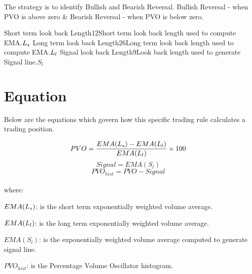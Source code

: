 \documentclass{article}
\begin{document}
\logo
{} %
\tblofcontents


\howtotrade
{The strategy is to identify Bullish and Bearish Reversal.
Bullish Reversal - when PVO is above zero \&
Bearish Reversal - when PVO is below zero.
}

{Short term look back Length}{12}{Short term look back length used to compute EMA.}{$L_{s}$}
{Long term look back Length}{26}{Long term look back length used to compute EMA.}{$L_{l}$}
{Signal look back Length}{9}{Look back length used to generate Signal line.}{$S_{l}$}
\stoptable %

\newpage
\section{Equation}
Below are the equations which govern how this specific trading rule calculates a trading position.

\begin{equation}
    PVO = \frac{EMA(L_{s}) -         EMA(L_{l})}{EMA(L_{l})} \times 100
\end{equation}
\begin{equation}
    Signal = EMA(S_{l})
\end{equation}
\begin{equation}
    PVO_{hist} = PVO - Signal
\end{equation}
\\ %
where:

$EMA(L_{s})$: is the short term exponentially weighted volume average.

$EMA(L_{l})$: is the long term exponentially weighted volume average.

$EMA(S_{l})$: is the exponentially weighted volume average computed to generate signal line.

$PVO_{hist}$: is the Percentage Volume Oscillator histogram.

\keyterms
\furtherlinks %
\end{document}
